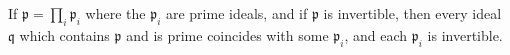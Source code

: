 If $\mathfrak{p} = \prod_i \mathfrak{p}_i$ where the $\mathfrak{p}_i$ are prime ideals, and if $\mathfrak{p}$ is invertible, then every ideal $\mathfrak{q}$ which contains $\mathfrak{p}$ and is prime coincides with some $\mathfrak{p}_i$, and each $\mathfrak{p}_i$ is invertible.
